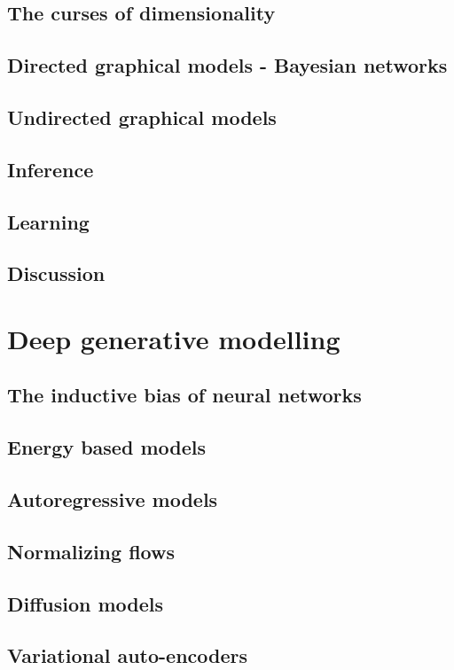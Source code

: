 \subsection{The curses of dimensionality}

\subsection{Directed graphical models - Bayesian networks}

\subsection{Undirected graphical models}

\subsection{Inference}

\subsection{Learning}

\subsection{Discussion}

\section{Deep generative modelling}
\subsection{The inductive bias of neural networks}
\subsection{Energy based models}
\subsection{Autoregressive models}
\subsection{Normalizing flows}
\subsection{Diffusion models}
\subsection{Variational auto-encoders}
